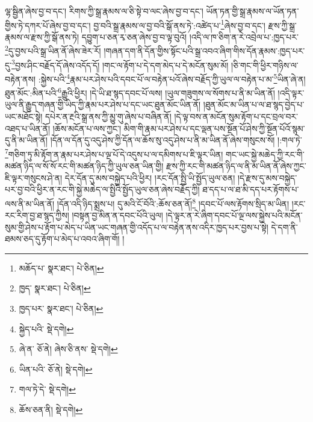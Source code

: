 ལྷ་སྦྱིན་ཞེས་བྱ་བ་དང་། རིགས་ཀྱི་སྒྲ་རྣམས་ལ་ཅི་སྟེ་བ་ལང་ཞེས་བྱ་བ་དང་། ཡོན་ཏན་གྱི་སྒྲ་རྣམས་ལ་ཡོན་ཏན་གྱིས་ཏེ་དཀར་པོ་ཞེས་བྱ་བ་དང་། བྱ་བའི་སྒྲ་རྣམས་ལ་བྱ་བའི་སྒོ་ནས་ཏེ་:འཚེད་པ་\footnote{མཆོད་པ་  སྣར་ཐང་།  པེ་ཅིན། }ཞེས་བྱ་བ་དང་། རྫས་ཀྱི་སྒྲ་རྣམས་ལ་རྫས་ཀྱི་སྒོ་ནས་ཏེ། དབྱུག་པ་ཅན་རྭ་ཅན་ཞེས་བྱ་བ་ལྟ་བུའོ། །འདི་ལ་ཁ་ཅིག་ན་རེ་འབྲེལ་པ་:ཁྱད་པར་\footnote{ཁྱད་  སྣར་ཐང་།  པེ་ཅིན། }དུ་བྱས་པའི་སྒྲ་ཡིན་ནོ་ཞེས་ཟེར་རོ། །གཞན་དག་ནི་དོན་གྱིས་སྟོང་པའི་སྒྲ་འབའ་ཞིག་གིས་དོན་རྣམས་:ཁྱད་པར་དུ་\footnote{ཁྱད་པར་  སྣར་ཐང་།  པེ་ཅིན། }བྱས་ཤིང་བརྗོད་དོ་ཞེས་འདོད་དོ། །གང་ལ་རྟོག་པ་དེ་དག་མེད་པ་དེ་མངོན་སུམ་མོ། །ཅི་གང་གི་ཕྱིར་གཉིས་ལ་བརྟེན་ནས། :སྐྱེས་པའི་\footnote{སྐྱེད་པའི་  སྡེ་དགེ། }རྣམ་པར་ཤེས་པའི་དབང་པོ་ལ་བརྟེན་པའོ་ཞེས་བརྗོད་ཀྱི་ཡུལ་ལ་བརྟེན་པ་མ་\footnote{ཞེ་ན་  ཅོ་ནེ། ཞེས་ཅི་ནས་  སྡེ་དགེ། }ཡིན་ཞེ་ན། ཐུན་མོང་:མིན་པའི་\footnote{ཡིན་པའི་  ཅོ་ནེ།  སྡེ་དགེ། }རྒྱུའི་ཕྱིར། །དེ་ཡི་ཐ་སྙད་དབང་པོ་ལས། །ཡུལ་གཟུགས་ལ་སོགས་པ་ནི་མ་ཡིན་ནོ། །འདི་ལྟར་ཡུལ་ནི་རྒྱུད་གཞན་གྱི་ཡིད་ཀྱི་རྣམ་པར་ཤེས་པ་དང་ཡང་ཐུན་མོང་ཡིན་ནོ། །ཐུན་མོང་མ་ཡིན་པ་ལ་ཐ་སྙད་བྱེད་པ་ཡང་མཐོང་སྟེ། དཔེར་ན་རྔའི་སྒྲ་ནས་ཀྱི་མྱུ་གུ་ཞེས་པ་བཞིན་ནོ། །དེ་ལྟ་བས་ན་མངོན་སུམ་རྟོག་པ་དང་བྲལ་བར་འཐད་པ་ཡིན་ནོ། །ཆོས་མངོན་པ་ལས་ཀྱང་། མིག་གི་རྣམ་པར་ཤེས་པ་དང་ལྡན་པས་སྔོན་པོ་ཤེས་ཀྱི་སྔོན་པོའོ་སྙམ་དུ་ནི་མ་ཡིན་ནོ། །དོན་ལ་དོན་དུ་འདུ་ཤེས་ཀྱི་དོན་ལ་ཆོས་སུ་འདུ་ཤེས་པ་ནི་མ་ཡིན་ནོ་ཞེས་གསུངས་སོ། །:གལ་ཏེ་\footnote{གལ་ཏེ་དེ་  སྡེ་དགེ། }གཅིག་ཏུ་མི་རྟོག་ན་རྣམ་པར་ཤེས་པ་ལྔ་པོ་དེ་འདུས་པ་ལ་དམིགས་པ་ཇི་ལྟར་ཡིན། གང་ཡང་སྐྱེ་མཆེད་ཀྱི་རང་གི་མཚན་ཉིད་ལ་སོ་སོ་རང་གི་མཚན་ཉིད་ཀྱི་ཡུལ་ཅན་ཡིན་གྱི། རྫས་ཀྱི་རང་གི་མཚན་ཉིད་ལ་ནི་མ་ཡིན་ནོ་ཞེས་ཀྱང་ཇི་ལྟར་གསུངས་ཤེ་ན། དེར་དོན་དུ་མས་བསྐྱེད་པའི་ཕྱིར། །རང་དོན་སྤྱི་ཡི་སྤྱོད་ཡུལ་ཅན། །དེ་རྫས་དུ་མས་བསྐྱེད་པར་བྱ་བའི་ཕྱིར་ན་རང་གི་སྐྱེ་མཆེད་ལ་སྤྱིའི་སྤྱོད་ཡུལ་ཅན་ཞེས་བརྗོད་ཀྱི། ཐ་དད་པ་ལ་ཐ་མི་དད་པར་རྟོགས་པ་ལས་ནི་མ་ཡིན་ནོ། །དོན་འདི་ཉིད་སྨྲས་པ། དུ་མའི་ངོ་བོའི་:ཆོས་ཅན་ནོ།\footnote{ཆོས་ཅན་ནི།  སྡེ་དགེ། } །དབང་པོ་ལས་རྟོགས་སྲིད་མ་ཡིན། །རང་རང་རིག་བྱ་ཐ་སྙད་ཀྱིས། །བསྟན་བྱ་མིན་ན་དབང་པོའི་ཡུལ། །དེ་ལྟར་ན་རེ་ཞིག་དབང་པོ་ལྔ་ལས་སྐྱེས་པའི་མངོན་སུམ་གྱི་ཤེས་པ་རྟོག་པ་མེད་པ་ཡིན་ཡང་གཞན་གྱི་འདོད་པ་ལ་བརྟེན་ནས་འདིར་ཁྱད་པར་བྱས་པ་སྟེ། དེ་དག་ནི་ཐམས་ཅད་དུ་རྟོག་པ་མེད་པ་འབའ་ཞིག་གོ། །

